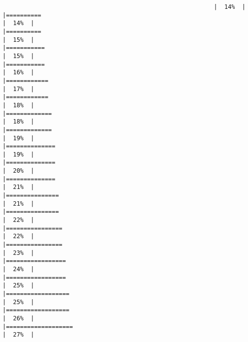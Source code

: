 \documentclass[
]{book}
\begin{document}
\begin{verbatim}
                                                            |  14%  |                                                                              |==========                                                            |  14%  |                                                                              |==========                                                            |  15%  |                                                                              |===========                                                           |  15%  |                                                                              |===========                                                           |  16%  |                                                                              |============                                                          |  17%  |                                                                              |============                                                          |  18%  |                                                                              |=============                                                         |  18%  |                                                                              |=============                                                         |  19%  |                                                                              |==============                                                        |  19%  |                                                                              |==============                                                        |  20%  |                                                                              |==============                                                        |  21%  |                                                                              |===============                                                       |  21%  |                                                                              |===============                                                       |  22%  |                                                                              |================                                                      |  22%  |                                                                              |================                                                      |  23%  |                                                                              |=================                                                     |  24%  |                                                                              |=================                                                     |  25%  |                                                                              |==================                                                    |  25%  |                                                                              |==================                                                    |  26%  |                                                                              |===================                                                   |  27%  |                                                                              
\end{verbatim}
\end{document}
